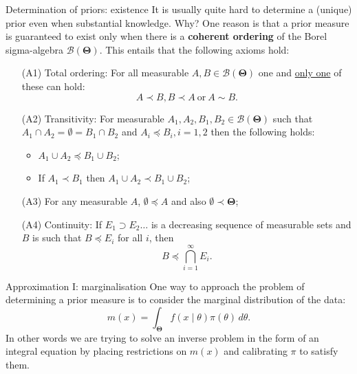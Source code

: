 \begin{frame}{Determination of priors: existence}
It is usually quite hard to determine a (unique) prior even when substantial knowledge.
Why?
One reason is that a prior measure is guaranteed to exist only when there is a \textbf{coherent ordering} of the Borel sigma-algebra $\mathcal{B}(\boldsymbol{\Theta})$.
This entails that the following axioms hold:
\begin{itemize}
 \item [(A1)] Total ordering: For all measurable $A, B \in \mathcal{B}(\boldsymbol{\Theta})$ one and \underline{only one} of these can hold:
 $$ A \prec B , B \prec A \:\text{or} \: A \sim B.$$
 \item [(A2)] Transitivity: For measurable $A_1, A_2, B_1, B_2 \in \mathcal{B}(\boldsymbol{\Theta})$ such that $A_1 \cap A_2 = \emptyset = B_1 \cap B_2$ and $A_i \preceq B_i, i = 1, 2$ then the following holds:
 \begin{itemize}
  \item $A_1 \cup A_2 \preceq B_1 \cup B_2$;
  \item If $A_1 \prec B_1$ then $A_1 \cup A_2 \prec B_1 \cup B_2$;
 \end{itemize}
 \item [(A3)] For any measurable $A$, $\emptyset \preceq A$ and also $\emptyset \prec \boldsymbol{\Theta}$;
 \item [(A4)] Continuity: If $E_1 \supset E_2 \ldots$ is a decreasing sequence of measurable sets and $B$ is such that $B \preceq E_i$ for all $i$, then
 $$ B \preceq \bigcap_{i=1}^\infty E_i.$$
\end{itemize}
\end{frame}
\begin{frame}{Approximation I: marginalisation}
 One way to approach the problem of determining a prior measure is to consider the marginal distribution of the data:
 \begin{equation}
  \label{eq:marginal_mx}
  m(x) = \int_{\boldsymbol{\Theta}} f(x\mid \theta)\pi(\theta)\,d\theta.
 \end{equation}
In other words we are trying to solve an inverse problem  in the form of an integral equation by placing restrictions on $m(x)$ and calibrating $\pi$ to satisfy them. 
\end{frame}
